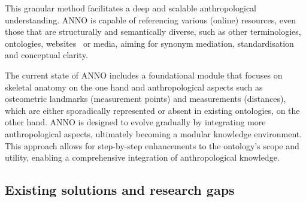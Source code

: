 \documentclass[sw]{iosart2x}
\begin{document}
This granular method facilitates a deep and scalable anthropological understanding.
ANNO is capable of referencing various (online) resources, even those that are structurally and semantically diverse, such as other terminologies, ontologies, websites~\citep{atinfo} or media, aiming for synonym mediation, standardisation and conceptual clarity.

The current state of ANNO includes a foundational module that focuses on skeletal anatomy on the one hand and anthropological aspects such as osteometric landmarks (measurement points) and measurements (distances),
which are either sporadically represented or absent in existing ontologies, on the other hand.
ANNO is designed to evolve gradually by integrating more anthropological aspects, ultimately becoming a modular knowledge environment.
This approach allows for step-by-step enhancements to the ontology's scope and utility, enabling a comprehensive integration of anthropological knowledge.

\subsection{Existing solutions and research gaps}\label{sec:Solutions+Gaps}
\end{document}
